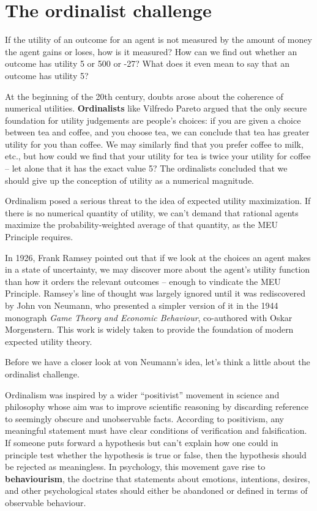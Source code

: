 \section{The ordinalist challenge}

If the utility of an outcome for an agent is not measured by the
amount of money the agent gains or loses, how is it measured? How can
we find out whether an outcome has utility 5 or 500 or -27? What does
it even mean to say that an outcome has utility 5?

At the beginning of the 20th century, doubts arose about the coherence
of numerical utilities. \textbf{Ordinalists} like Vilfredo Pareto
argued that the only secure foundation for utility judgements are
people's choices: if you are given a choice between tea and coffee,
and you choose tea, we can conclude that tea has greater utility for
you than coffee. We may similarly find that you prefer coffee to milk,
etc., but how could we find that your utility for tea is twice your
utility for coffee -- let alone that it has the exact value 5? The
ordinalists concluded that we should give up the conception of utility
as a numerical magnitude.


Ordinalism posed a serious threat to the idea of expected utility
maximization. If there is no numerical quantity of utility, we can't
demand that rational agents maximize the probability-weighted average
of that quantity, as the MEU Principle requires.

In 1926, Frank Ramsey pointed out that if we look at the choices an
agent makes in a state of uncertainty, we may discover more about the
agent's utility function than how it orders the relevant outcomes --
enough to vindicate the MEU Principle. Ramsey's line of thought was
largely ignored until it was rediscovered by John von Neumann, who
presented a simpler version of it in the 1944 monograph \emph{Game
  Theory and Economic Behaviour}, co-authored with Oskar Morgenstern.
This work is widely taken to provide the foundation of modern expected
utility theory.

Before we have a closer look at von Neumann's idea, let's think a little about
the ordinalist challenge.

Ordinalism was inspired by a wider ``positivist'' movement in science
and philosophy whose aim was to improve scientific reasoning by
discarding reference to seemingly obscure and unobservable facts.
According to positivism, any meaningful statement must have clear
conditions of verification and falsification. If someone puts forward
a hypothesis but can't explain how one could in principle test whether
the hypothesis is true or false, then the hypothesis should be
rejected as meaningless. In psychology, this movement gave rise to
\textbf{behaviourism}, the doctrine that statements about emotions,
intentions, desires, and other psychological states should either be
abandoned or defined in terms of observable behaviour.

